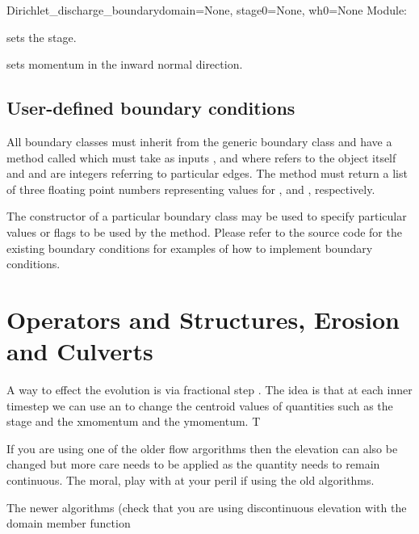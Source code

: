 \documentclass{manual}
\begin{document}
\begin{classdesc}{Dirichlet_discharge_boundary}{domain=None, stage0=None, wh0=None}
Module: 

 sets the stage.

 sets momentum in the inward normal direction.
\end{classdesc}

\section{User-defined boundary conditions}
\label{sec:roll your own}

All boundary classes must inherit from the generic boundary class
 and have a method called  which must
take as inputs ,  and  where  refers to the
object itself and  and  are integers referring to
particular edges. The method must return a list of three floating point
numbers representing values for ,
 and , respectively.

The constructor of a particular boundary class may be used to specify
particular values or flags to be used by the  method.
Please refer to the source code for the existing boundary conditions
for examples of how to implement boundary conditions.


\chapter{Operators and Structures, Erosion and Culverts}
\label{sec:operators}

A way to effect the evolution is via fractional step .  The idea is that at each inner timestep we can use 
an  to change the centroid values of quantities such as the stage and the xmomentum and the ymomentum. T

If you are using one of the older flow argorithms then the elevation can also be changed but more care needs to be applied as the  quantity needs to remain continuous. 
The moral, play with  at your peril if using the old algorithms. 

The newer algorithms (check that you are using discontinuous elevation with the domain member function 
\end{document}
